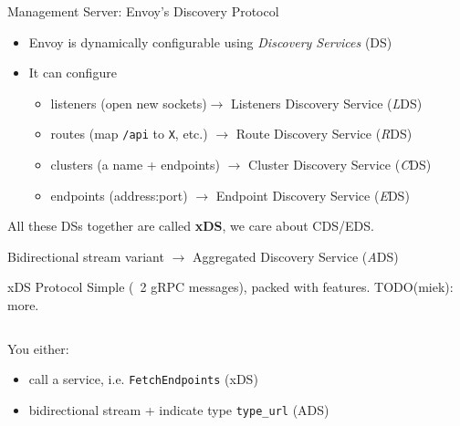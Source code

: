 \documentclass[aspectratio=169]{beamer}
\begin{document}
    \begin{frame}{Management Server: Envoy's Discovery Protocol}
        \begin{itemize}
            \item Envoy is dynamically configurable using \emph{Discovery Services} (DS)
            \item It can configure
            \begin{itemize}
                \item listeners (open new sockets)$\rightarrow$ Listeners Discovery Service (\emph{L}DS)
                \item routes (map \texttt{/api} to \texttt{X}, etc.) $\rightarrow$ Route Discovery Service (\emph{R}DS)
                \item clusters (a name + endpoints) $\rightarrow$ Cluster Discovery Service (\emph{C}DS)
                \item endpoints (address:port) $\rightarrow$ Endpoint Discovery Service (\emph{E}DS)
            \end{itemize}
        \end{itemize}

        All these DSs together are called {\bf xDS}, we care about CDS/EDS.

        Bidirectional stream variant $\rightarrow$ Aggregated Discovery Service (\emph{A}DS)
    \end{frame}

    \begin{frame}{xDS Protocol}
        Simple (~2 gRPC messages), packed with features. TODO(miek): more.
        \begin{columns}[T]
            \begin{column}{0.5\textwidth}
                
            \end{column}
            \begin{column}{0.5\textwidth}
                
            \end{column}
        \end{columns}

        You either:

        \begin{itemize}
            \item call a service, i.e. \texttt{FetchEndpoints} (xDS)
            \item bidirectional stream + indicate type \texttt{type\_url} (ADS)
        \end{itemize}
    \end{frame}
\end{document}

